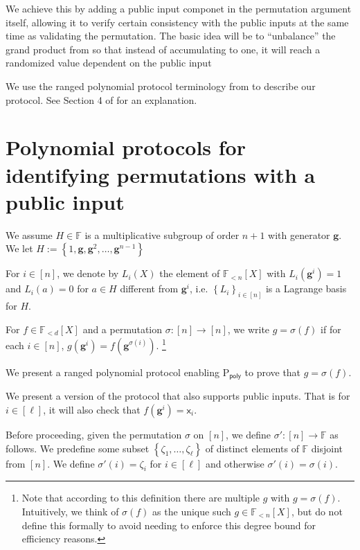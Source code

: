 \documentclass[11pt]{article} %
\newcommand{\F}{\ensuremath{\mathbb F}\xspace}
\newcommand{\sigof}[1]{\ensuremath{\sigma(#1)}\xspace}
\newcommand{\defeq}{:=}
\newcommand{\dom}{\ensuremath{H}\xspace}
\newcommand{\sett}[2]{\ensuremath{\set{#1}_{#2}}\xspace}
\newcommand{\prvpoly}{\ensuremath{\mathrm{P_{\mathsf{poly}}}}\xspace}
\newcommand{\inp}{\ensuremath{\mathsf{x}}\xspace}
\newcommand{\set}[1]{\ensuremath{\left\{#1\right\}}\xspace}
\newcommand{\hgen}{\ensuremath{\mathbf{g}}\xspace}
\newcommand{\polysofdeg}[1]{\ensuremath{\F_{< #1}[X]}\xspace}
\newcommand{\sig}{\ensuremath{\sigma}\xspace}
\begin{document}
We achieve this by adding a public input componet in the permutation argument itself, allowing it to verify certain consistency with the public inputs at the same time as validating the permutation.
The basic idea will be to ``unbalance'' the grand product from \cite{plonk} so that instead of accumulating to one,
it will reach a randomized value dependent on the public input


We use the ranged polynomial protocol terminology from \cite{plonk} to describe our protocol. See Section 4 of \cite{plonk} for an explanation.
\section{Polynomial protocols for identifying permutations with a public input}\label{sec:permprotocol}
 
We assume $H\in \F$ is a multiplicative subgroup of order $n+1$ with generator \hgen.
We let $\dom \defeq \set{1,\hgen,\hgen^2,\ldots,\hgen^{n-1}}$

For $i\in [n]$, we denote by $L_i(X)$ the element of \polysofdeg{n} with $L_i(\hgen^{i})=1$ and $L_i(a)=0$ for $a\in \dom$ different from  $\hgen^{i}$, i.e. \sett{L_i}{i\in [n]} is a Lagrange basis for $\dom$.




For $f\in \polysofdeg{d}$ and a permutation $\sigma :[n]\to [n]$,
we write $g=\sigma(f)$ if for each $i\in [n]$, $g(\hgen^{i}) = f(\hgen^{\sigma(i)})$. \footnote{Note that according to this definition there are multiple $g$ with $g=\sigma(f)$. Intuitively, we think of \sigof{f} as the unique such $g\in \polysofdeg{n}$, but do not define this formally to avoid needing to enforce this degree bound for efficiency reasons.}

We present a ranged polynomial protocol enabling \prvpoly to prove that
$g=\sigof{f}$.

We present a version of the protocol that also supports public inputs.
That is for $i\in [\ell]$, it will also check that $f(\hgen^i) = \inp_i$.

Before proceeding, given the permutation $\sig$ on $[n]$, we define $\sig':[n]\to \F$ as follows.
We predefine some subset $\set{\zeta_1,\ldots,\zeta_\ell}$ of distinct elements of \F disjoint from $[n]$.
We define $\sig'(i) = \zeta_i$ for $i\in [\ell]$ and otherwise $\sig'(i) =\sig(i)$.
\end{document}
